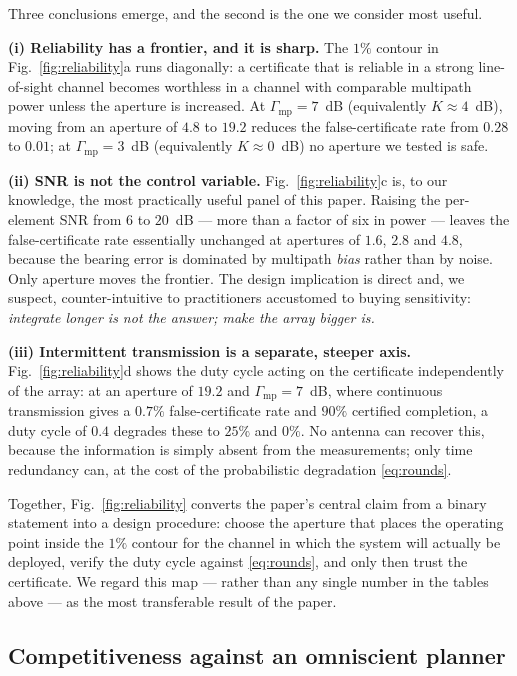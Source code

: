 \documentclass[preprint,12pt,3p]{elsarticle}
\theoremstyle{definition}
\begin{document}
Three conclusions emerge, and the second is the one we consider most useful.

\noindent\textbf{(i) Reliability has a frontier, and it is sharp.} The $1\%$ contour in
Fig.~\ref{fig:reliability}a runs diagonally: a certificate that is reliable in a strong
line-of-sight channel becomes worthless in a channel with comparable multipath power unless the
aperture is increased. At $\Gamma_{\mathrm{mp}}=7$~dB (equivalently $K\approx4$~dB), moving from an aperture of $4.8$ to $19.2$ reduces the false-certificate rate from $0.28$ to $0.01$; at $\Gamma_{\mathrm{mp}}=3$~dB (equivalently $K\approx0$~dB) no aperture we tested is safe.

\noindent\textbf{(ii) SNR is not the control variable.} Fig.~\ref{fig:reliability}c is, to our
knowledge, the most practically useful panel of this paper. Raising the per-element SNR from $6$ to
$20$~dB --- more than a factor of six in power --- leaves the false-certificate rate essentially
unchanged at apertures of $1.6$, $2.8$ and $4.8$, because the bearing error is dominated by
multipath \emph{bias} rather than by noise. Only aperture moves the frontier. The design implication
is direct and, we suspect, counter-intuitive to practitioners accustomed to buying sensitivity:
\emph{integrate longer is not the answer; make the array bigger is.}

\noindent\textbf{(iii) Intermittent transmission is a separate, steeper axis.}
Fig.~\ref{fig:reliability}d shows the duty cycle acting on the certificate independently of the
array: at an aperture of $19.2$ and $\Gamma_{\mathrm{mp}}=7$~dB, where continuous transmission gives a $0.7\%$
false-certificate rate and $90\%$ certified completion, a duty cycle of $0.4$ degrades these to
$25\%$ and $0\%$. No antenna can recover this, because the information is simply absent from the
measurements; only time redundancy can, at the cost of the probabilistic degradation
\eqref{eq:rounds}.

Together, Fig.~\ref{fig:reliability} converts the paper's central claim from a binary statement
into a design procedure: choose the aperture that places the operating point inside the $1\%$
contour for the channel in which the system will actually be deployed, verify the duty cycle
against \eqref{eq:rounds}, and only then trust the certificate. We regard this map --- rather than
any single number in the tables above --- as the most transferable result of the paper.

\subsection{Competitiveness against an omniscient planner}
\end{document}
